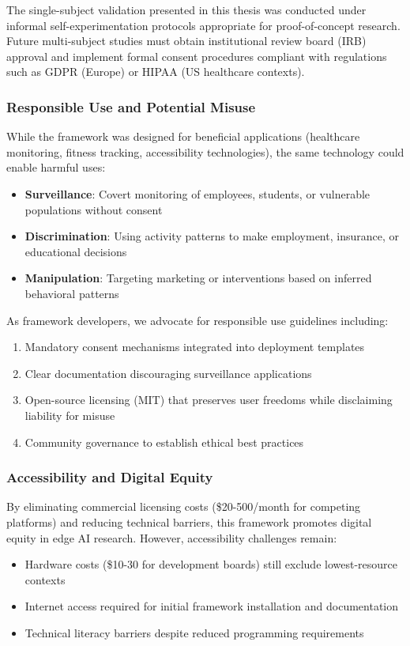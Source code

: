 The single-subject validation presented in this thesis was conducted under informal self-experimentation protocols appropriate for proof-of-concept research. Future multi-subject studies must obtain institutional review board (IRB) approval and implement formal consent procedures compliant with regulations such as GDPR (Europe) or HIPAA (US healthcare contexts).

\subsubsection{Responsible Use and Potential Misuse}
While the framework was designed for beneficial applications (healthcare monitoring, fitness tracking, accessibility technologies), the same technology could enable harmful uses:
\begin{itemize}
    \item \textbf{Surveillance}: Covert monitoring of employees, students, or vulnerable populations without consent
    \item \textbf{Discrimination}: Using activity patterns to make employment, insurance, or educational decisions
    \item \textbf{Manipulation}: Targeting marketing or interventions based on inferred behavioral patterns
\end{itemize}

As framework developers, we advocate for responsible use guidelines including:
\begin{enumerate}
    \item Mandatory consent mechanisms integrated into deployment templates
    \item Clear documentation discouraging surveillance applications
    \item Open-source licensing (MIT) that preserves user freedoms while disclaiming liability for misuse
    \item Community governance to establish ethical best practices
\end{enumerate}

\subsubsection{Accessibility and Digital Equity}
By eliminating commercial licensing costs (\$20-500/month for competing platforms) and reducing technical barriers, this framework promotes digital equity in edge AI research. However, accessibility challenges remain:
\begin{itemize}
    \item Hardware costs (\$10-30 for development boards) still exclude lowest-resource contexts
    \item Internet access required for initial framework installation and documentation
    \item Technical literacy barriers despite reduced programming requirements
\end{itemize}

